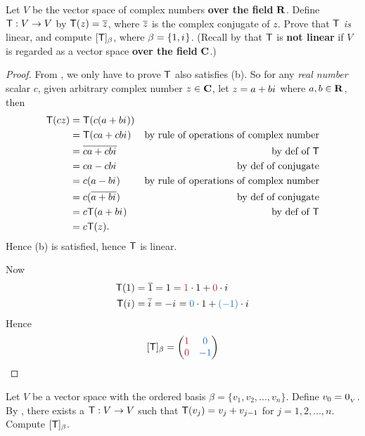 \begin{exercise} \label{exercise 2.2.9}
Let \(V\) be the vector space of complex numbers \textbf{over the field} \(\mathbf{R}\).
Define \(\textsf{T} : V \to V\) by \(\textsf{T}(z) = \overline{z}\), where \(\overline{z}\) is the complex conjugate of \(z\).
Prove that \(\textsf{T}\) \emph{is} linear, and compute \([\textsf{T}]_{\beta}\), where \(\beta = \{ 1, {i\mkern1mu} \}\).
(Recall by  that \(\textsf{T}\) is \textbf{not linear} if \(V\) is regarded as a vector space \textbf{over the field} \(\mathbf{C}\).)
\end{exercise}

\begin{proof}
From , we only have to prove \(\textsf{T}\) also satisfies (b).
So for any \emph{real number} scalar \(c\), given arbitrary complex number \(z \in \mathbf{C}\), let \(z = a + b{i\mkern1mu}\) where \(a, b \in \mathbf{R}\), then
\begin{align*}
    \textsf{T}(cz) & = \textsf{T}(c(a + b{i\mkern1mu})) \\
           & = \textsf{T}(ca + cb{i\mkern1mu}) & \text{by rule of operations of complex number} \\
           & = \overline{ca + cb{i\mkern1mu}} & \text{by def of \(\textsf{T}\)} \\
           & = ca - cb{i\mkern1mu} & \text{by def of conjugate} \\
           & = c(a - b{i\mkern1mu}) & \text{by rule of operations of complex number} \\
           & = c(\overline{a + b{i\mkern1mu}}) & \text{by def of conjugate} \\
           & = c\textsf{T}(a + b{i\mkern1mu}) & \text{by def of \(\textsf{T}\)} \\
           & = c\textsf{T}(z).
\end{align*}
Hence (b) is satisfied, hence \(\textsf{T}\) is linear.

Now
\begin{align*}
    \T(1) & = \conjugatet{1} = 1 = \MAROON{1} \cdot 1 + \MAROON{0} \cdot \iu \\
    \T(\iu) & = \conjugatet{\iu} = -\iu = \BLUE{0} \cdot 1 + \BLUE{(-1)} \cdot \iu \\
\end{align*}
Hence
\[
    [\T]_{\beta} = \begin{pmatrix}
        \MAROON{1} & \BLUE{0} \\
        \MAROON{0} & \BLUE{-1} \\
    \end{pmatrix}
\]
\end{proof}

\begin{exercise} \label{exercise 2.2.10}
Let \(V\) be a vector space with the ordered basis \(\beta = \{ v_1, v_2, ..., v_n \}\).
Define \(v_0 = 0_{_V}\).
By , there exists a \LTRAN{} \(\textsf{T}: V \to V\) such that \(\textsf{T}(v_j) = v_j + v_{j - 1}\) for \(j = 1, 2, ..., n\).
Compute \([\textsf{T}]_{\beta}\).
\end{exercise}

